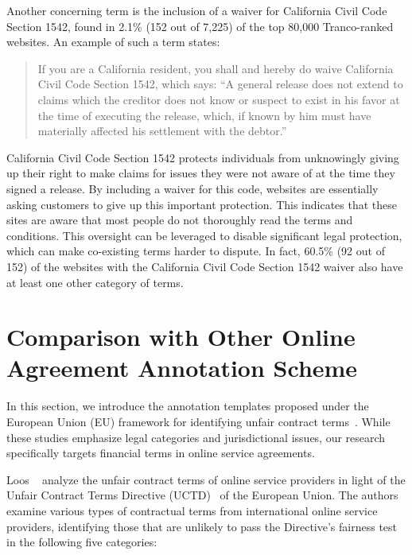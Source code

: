  Another concerning \termname term is the inclusion of a waiver for California Civil Code Section 1542, found in 2.1\% (152 out of 7,225) of the top 80,000 Tranco-ranked websites. An example of such a term states:

\begin{quote}
If you are a California resident, you shall and hereby do waive California Civil Code Section 1542, which says: “A general release does not extend to claims which the creditor does not know or suspect to exist in his favor at the time of executing the release, which, if known by him must have materially affected his settlement with the debtor.”
\end{quote}

California Civil Code Section 1542 protects individuals from unknowingly giving up their right to make claims for issues they were not aware of at the time they signed a release. By including a waiver for this code, websites are essentially asking customers to give up this important protection. This indicates that these sites are aware that most people do not thoroughly read the terms and conditions. This oversight can be leveraged to disable significant legal protection, which can make co-existing \termname terms harder to dispute. In fact, 60.5\% (92 out of 152) of the websites with the California Civil Code Section 1542 waiver also have at least one other category of \termname terms.










\section{Comparison with Other Online Agreement Annotation Scheme}
\label{sec:appendix_other_templates}

In this section, we introduce the annotation templates proposed under the European Union (EU) framework for identifying unfair contract terms~\citep{loos2016wanted, galassi2024unfair, galassi2020cross, lippi2019claudette, drazewski2021corpus}. While these studies emphasize legal categories and jurisdictional issues, our research specifically targets financial terms in online service agreements. 

Loos \etal~\citep{loos2016wanted} analyze the unfair contract terms of online service providers in light of the Unfair Contract Terms Directive (UCTD)~\citep{CouncilDirective1993} of the European Union. The authors examine various types of contractual terms from international online service providers, identifying those that are unlikely to pass the Directive’s fairness test in the following five categories:

